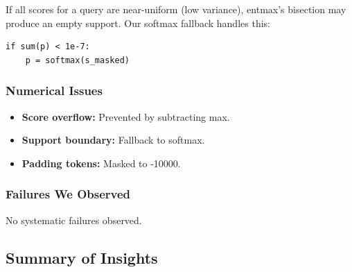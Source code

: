 If all scores for a query are near-uniform (low variance), entmax's bisection 
may produce an empty support. Our softmax fallback handles this:

\begin{lstlisting}
if sum(p) < 1e-7:
    p = softmax(s_masked)
\end{lstlisting}

\subsubsection{Numerical Issues}

\begin{itemize}
\item \textbf{Score overflow:} Prevented by subtracting max.
\item \textbf{Support boundary:} Fallback to softmax.
\item \textbf{Padding tokens:} Masked to -10000.

\end{itemize}
\subsubsection{Failures We Observed}

No systematic failures observed.

\subsection{Summary of Insights}

